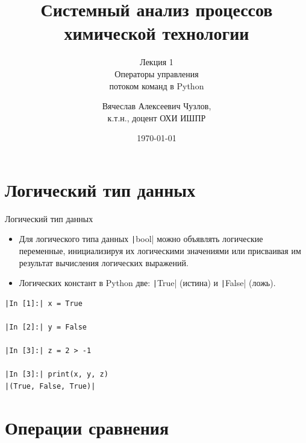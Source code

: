 \documentclass[aspectratio=169]{beamer}	%
\title{\LARGE{Системный анализ процессов химической технологии}}
\subtitle{Лекция 1 \\ Операторы управления \\ потоком команд в Python}
\author[]{Вячеслав Алексеевич Чузлов, \\
	к.т.н., доцент ОХИ ИШПР}
\date{\today}
\begin{document}

\titleframe		%

\tocframe{}		%



\section{Логический тип данных}
\sectionframe


\begin{frame}[fragile]{Логический тип данных}
\scriptsize
\begin{itemize}

\item Для логического типа данных \texttt|bool| можно объявлять логические переменные, инициализируя их логическими значениями или присваивая им результат вычисления логических выражений.

\item Логических констант в Python две: \texttt|True| (истина) и \texttt|False| (ложь).
\end{itemize}

\begin{verbatim}
|In [1]:| x = True

|In [2]:| y = False

|In [3]:| z = 2 > -1

|In [3]:| print(x, y, z)
|(True, False, True)|
\end{verbatim}

\vfill
\end{frame}


\section{Операции сравнения}
\sectionframe
\end{document}
